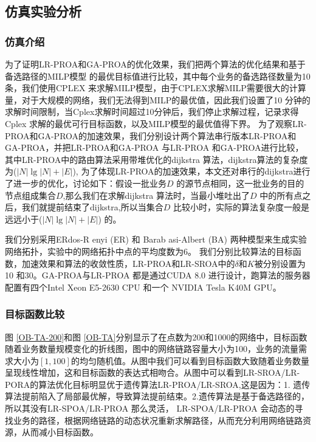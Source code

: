 \subsection{仿真实验分析}
\subsubsection {仿真介绍}

为了证明LR-PROA和GA-PROA的优化效果，我们把两个算法的优化结果和基于备选路径的MILP模型\cite{multi-commodity} 的最优目标值进行比较，其中每个业务的备选路径数量为10条，我们使用CPLEX \cite{CPLEX}来求解MILP模型，由于CPLEX求解MILP需要很大的计算量，对于大规模的网络，我们无法得到MILP的最优值，因此我们设置了10 分钟的求解时间限制，当Cplex求解时间超过10分钟后，我们停止求解过程，记录求得Cplex 求解的最优可行目标函数，以及MILP模型的最优值得下界。
为了观察LR-PROA和GA-PROA的加速效果，我们分别设计两个算法串行版本LR-PROA和GA-PROA，并把LR-PROA和GA-PROA 与LR-PROA 和GA-PROA进行比较，其中LR-PROA中的路由算法采用带堆优化的dijkstra 算法，dijkstra算法的复杂度为($|N|\lg |N| +|E|$), 为了体现LR-PROA的加速效果，本文还对串行的dijkstra进行了进一步的优化，讨论如下：假设一批业务$D$ 的源节点相同，这一批业务的目的节点组成集合$D$,那么我们在求解dijkstra 算法时，当最小堆吐出了$D$ 中的所有点之后，我们就提前结束了dijkstra,所以当集合$D$ 比较小时，实际的算法复杂度一般是远远小于($|N|\lg |N| +|E|$) 的。

我们分别采用ERdos-R enyi (ER) \cite{ER}和 Barab asi-Albert (BA) \cite{BA}两种模型来生成实验网络拓扑，实验中的网络拓扑中点的平均度数为6。 我们分别比较算法的目标函数，加速效果和算法的收敛性质，LR-PROA和LR-SROA中的$\delta$和$K$被分别设置为10 和30。GA-PROA与LR-PROA 都是通过CUDA 8.0 进行设计，跑算法的服务器配置有四个Intel Xeon E5-2630 CPU 和一个 NVIDIA Tesla K40M GPU。
 \subsubsection{目标函数比较}
 图 \ref{OB-TA-200}和图 \ref{OB-TA}分别显示了在点数为200和1000的网络中，目标函数随着业务数量规模变化的折线图，图中的网络链路容量大小为100，业务的流量需求大小为$[1,100]$的均匀随机值。从图中我们可以看到目标函数大致随着业务数量呈现线性增加，这和目标函数的表达式相吻合。从图中可以看到LR-SROA/LR-PORA的算法优化目标明显优于遗传算法LR-PROA/LR-SROA,这是因为：1. 遗传算法提前陷入了局部最优解，导致算法提前结束。2.遗传算法是基于备选路径的，所以其没有LR-SPOA/LR-PROA 那么灵活， LR-SPOA/LR-PROA 会动态的寻找业务的路径，根据网络链路的动态状况重新求解路径，从而充分利用网络链路资源，从而减小目标函数。

